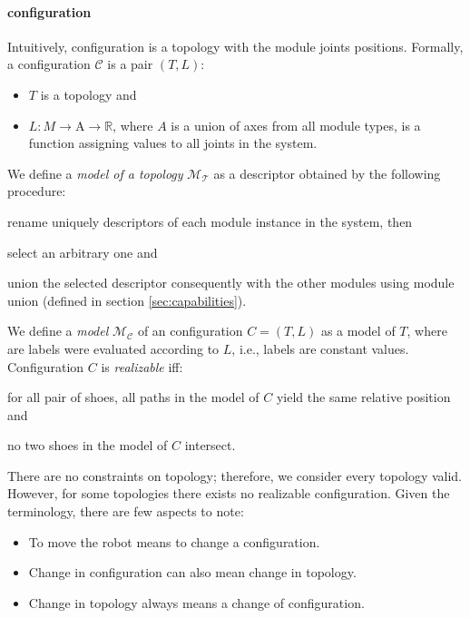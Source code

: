 \paragraph{configuration} Intuitively, configuration is a topology with the
 module joints positions. Formally, a configuration $\mathcal{C}$ is a pair $(T,
 L)$:
 \begin{itemize}
    \item $T$ is a topology and
    \item $L: M \rightarrow \text{A} \rightarrow \mathds{R}$, where $A$ is a
    union of axes from all module types, is a function assigning values to all
    joints in the system.
 \end{itemize}

We define a \emph{model of a topology} $\mathcal{M}_\mathcal{T}$ as a descriptor
obtained by the following procedure:
\begin{enumerate*}
    \item rename uniquely descriptors of each module instance in the system, then
    \item select an arbitrary one and
    \item union the selected descriptor consequently with the other modules
    using module union (defined in section \ref{sec:capabilities}).
\end{enumerate*}
We define a \emph{model} $\mathcal{M}_\mathcal{C}$ of an configuration
$C=(T, L)$ as a model of $T$, where are labels were evaluated according to $L$,
i.e., labels are constant values. Configuration $C$ is \emph{realizable} iff:
\begin{enumerate*}
    \item for all pair of shoes, all paths in the model of $C$ yield the same
    relative position and
    \item no two shoes in the model of $C$ intersect.
\end{enumerate*}

There are no constraints on topology; therefore, we consider every topology
valid. However, for some topologies there exists no realizable configuration.
Given the terminology, there are few aspects to note:
\begin{itemize}
    \item To move the robot means to change a configuration.
    \item Change in configuration can also mean change in topology.
    \item Change in topology always means a change of configuration.
\end{itemize}

